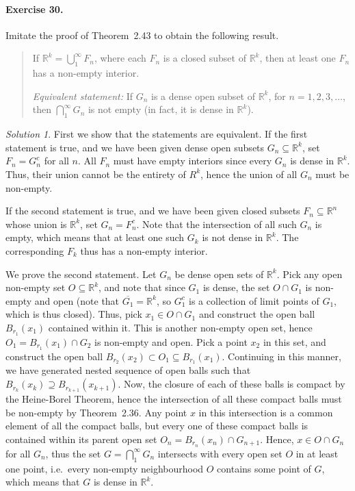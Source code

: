 \documentclass[11pt]{report}
\def\R{\mathbb{R}}
\theoremstyle{remark}
\newtheorem*{solution}{Solution}
\begin{document}
    \paragraph{Exercise 30.} Imitate the proof of Theorem~2.43 to obtain the
    following result.
    \begin{quote}
        If $\R^{k} = \bigcup_1^\infty F_n$, where each $F_n$ is a closed subset of
        $\R^k$, then at least one $F_n$ has a non-empty interior.

        \textit{Equivalent statement:} If $G_n$ is a dense open subset of $\R^k$,
        for $n = 1, 2, 3, \dots$, then $\bigcap_1^\infty G_n$ is not empty (in fact,
        it is dense in $\R^k$).
    \end{quote}
    \begin{solution}
        First we show that the statements are equivalent. If the first statement is
        true, and we have been given dense open subsets $G_n \subseteq \R^k$, set
        $F_n = G_n^c$ for all $n$. All $F_n$ must have empty interiors since every
        $G_n$ is dense in $\R^k$. Thus, their union cannot be the entirety of $R^k$,
        hence the union of all $G_n$ must be non-empty.

        If the second statement is true, and we have been given closed subsets $F_n
        \subseteq \R^n$ whose union is $\R^k$, set $G_n = F_n^c$. Note that the
        intersection of all such $G_n$ is empty, which means that at least one such
        $G_k$ is not dense in $\R^k$. The corresponding $F_k$ thus has a non-empty
        interior.

        We prove the second statement. Let $G_n$ be dense open sets of $\R^k$. Pick
        any open non-empty set $O \subseteq \R^k$, and note that since $G_1$ is
        dense, the set $O \cap G_1$ is non-empty and open (note that $\overline{G_1}
        = \R^k$, so $G_1^c$ is a collection of limit points of $G_1$, which is thus
        closed). Thus, pick $x_1 \in O \cap G_1$ and construct the open ball
        $B_{r_1}(x_1)$ contained within it. This is another non-empty open set,
        hence $O_1 = B_{r_1}(x_1) \cap G_2$ is non-empty and open. Pick a point
        $x_2$ in this set, and construct the open ball $B_{r_2}(x_2) \subset O_1
        \subseteq B_{r_1}(x_1)$. Continuing in this manner, we have generated nested
        sequence of open balls such that $B_{r_k}(x_k) \supseteq B_{r_{k + 1}}(x_{k
        + 1})$.  Now, the closure of each of these balls is compact by the
        Heine-Borel Theorem, hence the intersection of all these compact balls must
        be non-empty by Theorem~2.36. Any point $x$ in this intersection is a common
        element of all the compact balls, but every one of these compact balls is
        contained within its parent open set $O_n = B_{r_n}(x_n) \cap G_{n + 1}$.
        Hence, $x \in O \cap G_n$ for all $G_n$, thus the set $G = \bigcap_1^\infty
        G_n$ intersects with every open set $O$ in at least one point, i.e.\ every
        non-empty neighbourhood $O$ contains some point of $G$, which means that $G$
        is dense in $\R^k$.
    \end{solution}
    
    
    
\end{document}
